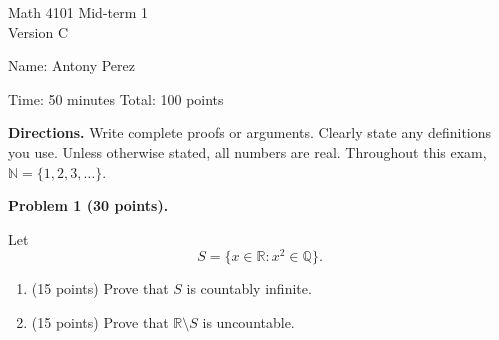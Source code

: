 \documentclass[11pt]{article}
\begin{document}
\begin{center}
    {\large Math 4101 Mid-term 1}\\[2pt]
    {\large Version C}
\end{center}

\noindent Name: Antony Perez

\medskip
\noindent Time: 50 minutes \hfill Total: 100 points

\medskip
\noindent \textbf{Directions.} Write complete proofs or arguments. Clearly state any definitions you use.
Unless otherwise stated, all numbers are real. Throughout this exam, $\mathbb{N} = \{1, 2, 3, \dots\}$.

\bigskip

\noindent\textbf{Problem 1 (30 points).}

\noindent Let
\[
S = \{x \in \mathbb{R} : x^2 \in \mathbb{Q}\}.
\]

\begin{enumerate}[label=(\alph*)]
    \item (15 points) Prove that $S$ is countably infinite.
    \item (15 points) Prove that $\mathbb{R} \setminus S$ is uncountable.
\end{enumerate}
\end{document}
